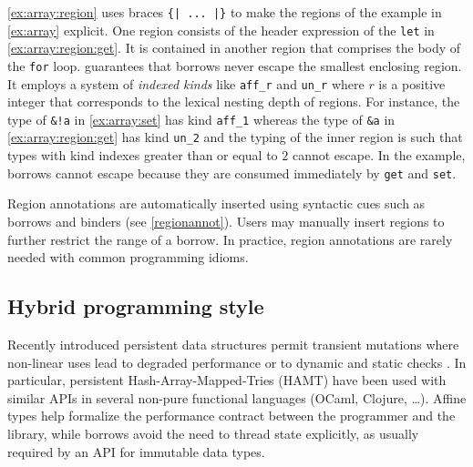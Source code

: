 \cref{ex:array:region} uses braces \lstinline/{| ... |}/ to make the
regions of the example in \cref{ex:array} explicit.  One
region consists of the header expression of the \lstinline/let/ in
\cref{ex:array:region:get}. It is contained in another region that
comprises the body of the \lstinline/for/ loop. \lang guarantees that borrows
never escape the smallest enclosing region. It employs a system of
\emph{indexed kinds} like \lstinline{aff_r} and \lstinline{un_r} where
$r$ is a positive integer that corresponds to the lexical nesting
depth of regions. For instance, the type of \lstinline{&!a} in
\cref{ex:array:set} has kind \lstinline{aff_1} whereas the type of
\lstinline{&a} in \cref{ex:array:region:get} has kind
\lstinline{un_2} and the typing of the inner region is such that types with
kind indexes greater than or equal to $2$ cannot escape.
In the example, borrows cannot escape  because they are consumed
immediately by \lstinline/get/ and \lstinline/set/.

Region annotations are automatically inserted using
syntactic cues such as borrows and binders (see
\cref{regionannot}).  Users may manually insert regions to further restrict the range of a
borrow. In practice, region annotations are
rarely needed with common programming idioms.






\subsection{Hybrid programming style}

Recently introduced persistent data structures
permit transient mutations where
non-linear uses lead to degraded performance
\cite{DBLP:conf/ml/ConchonF07} or to
dynamic and static checks \cite{DBLP:journals/pacmpl/Puente17}.
In particular, persistent Hash-Array-Mapped-Tries (HAMT) have been used with similar
APIs in several non-pure functional languages (OCaml, Clojure, \dots).
Affine types help formalize the performance contract between the programmer
and the library, while borrows avoid the need to thread state explicitly,
as usually required by an API for immutable data types.
%

